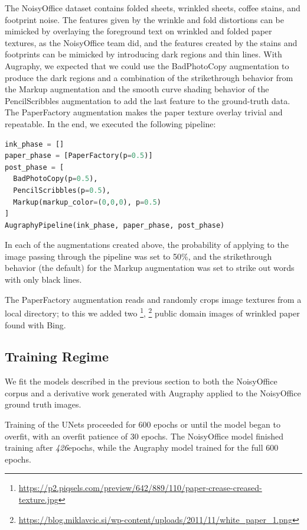 \documentclass[runningheads]{llncs}
\newcommand{\numNoisyOfficeUNetEpochs}{\emph{426}}
\begin{document}
The NoisyOffice dataset contains folded sheets, wrinkled sheets, coffee stains, and footprint noise.
The features given by the wrinkle and fold distortions can be mimicked by overlaying the foreground text on wrinkled and folded paper textures, as the NoisyOffice team did, and the features created by the stains and footprints can be mimicked by introducing dark regions and thin lines.
With Augraphy, we expected that we could use the BadPhotoCopy augmentation to produce the dark regions and a combination of the strikethrough behavior from the Markup augmentation and the smooth curve shading behavior of the PencilScribbles augmentation to add the last feature to the ground-truth data.
The PaperFactory augmentation makes the paper texture overlay trivial and repeatable. In the end, we executed the following pipeline:

\begin{lstlisting}[language=Python, label={lst:test-pipeline}, caption={Pipeline used for test data generation.}]
ink_phase = []
paper_phase = [PaperFactory(p=0.5)]
post_phase = [
  BadPhotoCopy(p=0.5),
  PencilScribbles(p=0.5),
  Markup(markup_color=(0,0,0), p=0.5)
]
AugraphyPipeline(ink_phase, paper_phase, post_phase)
\end{lstlisting}

In each of the augmentations created above, the probability of applying to the image passing through the pipeline was set to 50\%, and the strikethrough behavior (the default) for the Markup augmentation was set to strike out words with only black lines.

The PaperFactory augmentation reads and randomly crops image textures from a local directory; to this we added two \footnote{\url{https://p2.piqsels.com/preview/642/889/110/paper-crease-creased-texture.jpg}}, \footnote{\url{https://blog.miklavcic.si/wp-content/uploads/2011/11/white_paper_1.png}} public domain images of wrinkled paper found with Bing.

\subsection{Training Regime}
We fit the models described in the previous section to both the NoisyOffice corpus and a derivative work generated with Augraphy applied to the NoisyOffice ground truth images.

Training of the UNets proceeded for 600 epochs or until the model began to overfit, with an overfit patience of 30 epochs.
The NoisyOffice model finished training after \numNoisyOfficeUNetEpochs epochs, while the Augraphy model trained for the full 600 epochs.
\end{document}
